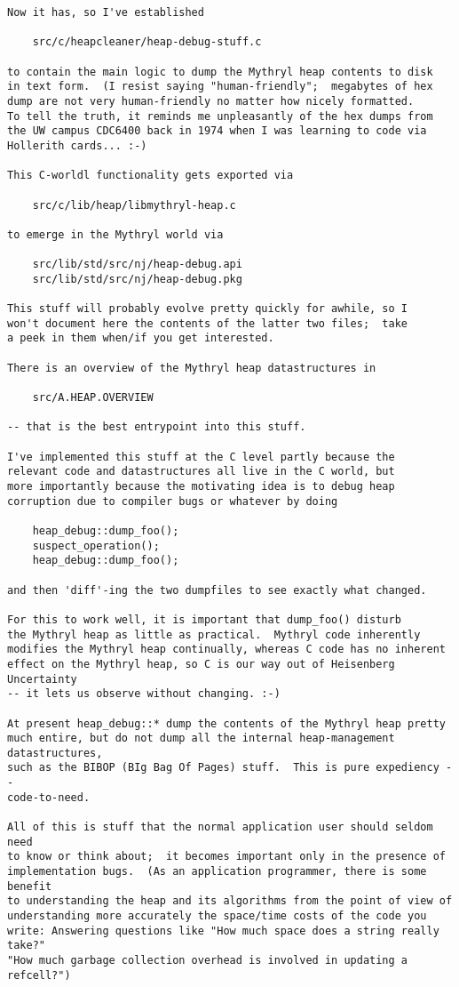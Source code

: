\begin{verbatim}
Now it has, so I've established 
 
    src/c/heapcleaner/heap-debug-stuff.c 
 
to contain the main logic to dump the Mythryl heap contents to disk 
in text form.  (I resist saying "human-friendly";  megabytes of hex 
dump are not very human-friendly no matter how nicely formatted. 
To tell the truth, it reminds me unpleasantly of the hex dumps from 
the UW campus CDC6400 back in 1974 when I was learning to code via 
Hollerith cards... :-) 
 
This C-worldl functionality gets exported via 
 
    src/c/lib/heap/libmythryl-heap.c 
 
to emerge in the Mythryl world via 
 
    src/lib/std/src/nj/heap-debug.api 
    src/lib/std/src/nj/heap-debug.pkg 
 
This stuff will probably evolve pretty quickly for awhile, so I 
won't document here the contents of the latter two files;  take 
a peek in them when/if you get interested. 
 
There is an overview of the Mythryl heap datastructures in 
 
    src/A.HEAP.OVERVIEW 
 
-- that is the best entrypoint into this stuff. 
 
I've implemented this stuff at the C level partly because the 
relevant code and datastructures all live in the C world, but 
more importantly because the motivating idea is to debug heap 
corruption due to compiler bugs or whatever by doing 

    heap_debug::dump_foo(); 
    suspect_operation(); 
    heap_debug::dump_foo(); 
 
and then 'diff'-ing the two dumpfiles to see exactly what changed. 
 
For this to work well, it is important that dump_foo() disturb 
the Mythryl heap as little as practical.  Mythryl code inherently 
modifies the Mythryl heap continually, whereas C code has no inherent 
effect on the Mythryl heap, so C is our way out of Heisenberg Uncertainty 
-- it lets us observe without changing. :-) 
 
At present heap_debug::* dump the contents of the Mythryl heap pretty 
much entire, but do not dump all the internal heap-management datastructures, 
such as the BIBOP (BIg Bag Of Pages) stuff.  This is pure expediency -- 
code-to-need. 
 
All of this is stuff that the normal application user should seldom need 
to know or think about;  it becomes important only in the presence of 
implementation bugs.  (As an application programmer, there is some benefit 
to understanding the heap and its algorithms from the point of view of 
understanding more accurately the space/time costs of the code you 
write: Answering questions like "How much space does a string really take?" 
"How much garbage collection overhead is involved in updating a 
refcell?") 
 

\end{verbatim}
